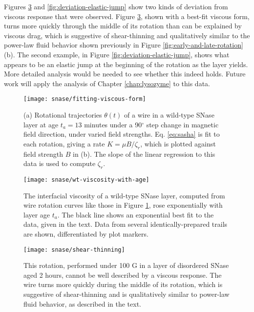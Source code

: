 Figures \ref{fig:deviation-shear-thinning} and \ref{fig:deviation-elastic-jump} show two kinds of deviation from viscous response that were observed. Figure \ref{fig:deviation-shear-thinning}, shown with a best-fit viscous form, turns more quickly through the middle of its rotation than can be explained by viscous drag, which is suggestive of shear-thinning and qualitatively similar to the power-law fluid behavior shown previously in Figure \ref{fig:early-and-late-rotation}(b). The second example, in Figure \ref{fig:deviation-elastic-jump}, shows what appears to be an elastic jump at the beginning of the rotation as the layer yields. More detailed analysis would be needed to see whether this indeed holds. Future work will apply the analysis of Chapter \ref{chap:lysozyme} to this data.

   \begin{figure}
    \centering
    \texttt{[image: snase/fitting-viscous-form]} %
    \caption[Rotational viscous drag on a nanowire extracted from rotational tragictories]{\label{fig:fitting-viscous-form}(a) Rotational trajectories $\theta(t)$ of a wire in a wild-type SNase layer at age $t_a=13$ minutes under a 90$^\circ$ step change in magnetic field direction, under varied field strengths. Eq. \ref{eq:sasha} is fit to each rotation, giving a rate $K=\mu B/\zeta_r$, which is plotted against field strength $B$ in (b). The slope of the linear regression to this data is used to compute $\zeta_r$.}
    \end{figure}

   \begin{figure}
    \centering
    \texttt{[image: snase/wt-viscosity-with-age]}
    \caption[The interfacial viscosity of a wild-type SNase layer as a function of layer age.]{\label{fig:wt-viscosity-with-age}The interfacial viscosity of a wild-type SNase layer, computed from wire rotation curves like those in Figure \ref{fig:fitting-viscous-form}, rose exponentially with layer age $t_a$. The black line shows an exponential best fit to the data, given in the text. Data from several identically-prepared trails are shown, differentiated by plot markers.}
    \end{figure}
    
\begin{figure}
    \centering
    \texttt{[image: snase/shear-thinning]} %
    \caption[A wire rotation in a disordered SNase layer that cannot be well described by a viscous response.]{\label{fig:deviation-shear-thinning}This rotation, performed under 100 G in a layer of disordered SNase aged 2 hours, cannot be well described by a viscous response. The wire turns more quickly during the middle of its rotation, which is suggestive of shear-thinning and is qualitatively similar to power-law fluid behavior, as described in the text.}
    \end{figure}
    
